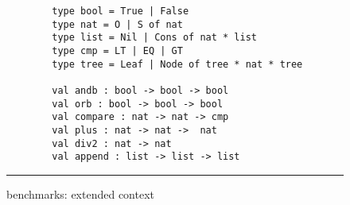 \begin{figure}
  \begin{minipage}{\textwidth}
    \begin{center}
      \begin{lstlisting}
        type bool = True | False
        type nat = O | S of nat
        type list = Nil | Cons of nat * list
        type cmp = LT | EQ | GT
        type tree = Leaf | Node of tree * nat * tree

        val andb : bool -> bool -> bool
        val orb : bool -> bool -> bool
        val compare : nat -> nat -> cmp
        val plus : nat -> nat ->  nat
        val div2 : nat -> nat
        val append : list -> list -> list
      \end{lstlisting}
    \end{center}
  \end{minipage}

  \hrule
  \caption{\myth{} benchmarks: extended context}
  \label{fig:myth-extended-context}
\end{figure}

